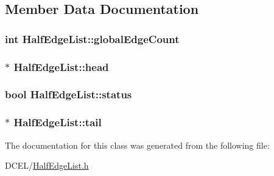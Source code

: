 \subsection{Member Data Documentation}
\subsubsection[{\texorpdfstring{global\+Edge\+Count}{globalEdgeCount}}]{\setlength{\rightskip}{0pt plus 5cm}int Half\+Edge\+List\+::global\+Edge\+Count}\hypertarget{classHalfEdgeList_a1cbffdcfa1d2fb6fa88ba53bafb994ff}{}\label{classHalfEdgeList_a1cbffdcfa1d2fb6fa88ba53bafb994ff}
\subsubsection[{\texorpdfstring{head}{head}}]{$\ast$ Half\+Edge\+List\+::head}\hypertarget{classHalfEdgeList_a9fb4b7ad63ecee17aa4c58c4623e1287}{}\label{classHalfEdgeList_a9fb4b7ad63ecee17aa4c58c4623e1287}
\subsubsection[{\texorpdfstring{status}{status}}]{\setlength{\rightskip}{0pt plus 5cm}bool Half\+Edge\+List\+::status\hspace{0.3cm}{\ttfamily [protected]}}\hypertarget{classHalfEdgeList_a8800a6048cc16922c4b123495852b989}{}\label{classHalfEdgeList_a8800a6048cc16922c4b123495852b989}
\subsubsection[{\texorpdfstring{tail}{tail}}]{$\ast$ Half\+Edge\+List\+::tail}\hypertarget{classHalfEdgeList_a152489ca538b0bb90a00cc94eba50aed}{}\label{classHalfEdgeList_a152489ca538b0bb90a00cc94eba50aed}


The documentation for this class was generated from the following file\+:\begin{DoxyCompactItemize}
\item 
D\+C\+E\+L/\hyperlink{HalfEdgeList_8h}{Half\+Edge\+List.\+h}\end{DoxyCompactItemize}
